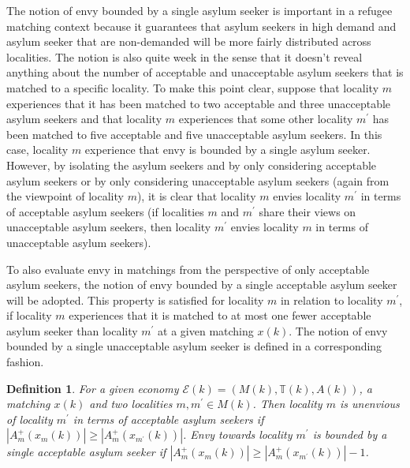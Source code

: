 \documentclass[12pt,fleqn]{article}
\newtheorem{definition}{Definition}
\begin{document}
\noindent The notion of envy bounded by a single asylum seeker is important in a refugee matching context because it guarantees that asylum seekers in high demand and asylum seeker that are non-demanded will be more fairly distributed across localities. The notion is also quite week in the sense that it doesn't reveal anything about the number of acceptable and unacceptable asylum seekers that is matched to a specific locality. To make this point clear, suppose that locality $m$ experiences that it has been matched to two acceptable and three unacceptable asylum seekers and that locality $m$ experiences that some other locality $m^\prime$ has been matched to five acceptable and five unacceptable asylum seekers. In this case, locality $m$ experience that envy is bounded by a single asylum seeker. However, by isolating the asylum seekers and by only considering acceptable asylum seekers or by only considering unacceptable asylum seekers (again from the viewpoint of locality $m$), it is clear that locality $m$ envies locality $m^\prime$ in terms of acceptable asylum seekers (if localities $m$ and $m^\prime$ share their views on unacceptable asylum seekers, then locality $m^\prime$ envies locality $m$ in terms of unacceptable asylum seekers).

To also evaluate envy in matchings from the perspective of only acceptable asylum seekers, the notion of envy bounded by a single acceptable asylum seeker will be adopted. This property is satisfied for locality $m$ in relation to locality $m^\prime$, if locality $m$ experiences that it is matched to at most one fewer acceptable asylum seeker than locality $m^\prime$ at a given matching $x(k)$. The notion of envy bounded by a single unacceptable asylum seeker is defined in a corresponding fashion.

\begin{definition}\rm\label{DEF:1-Envy_ACC}
For a given economy $\mathcal{E}(k)=(M(k),\mathbb{T}(k),A(k))$, a matching $x(k)$ and two localities $m,m^\prime\in M(k)$. Then locality $m$ is unenvious of locality $m^\prime$ in terms of acceptable asylum seekers if $|A_m^+(x_m(k))|\geq |A_m^+(x_{m^\prime}(k))|$. Envy towards locality $m^\prime$ is bounded by a single acceptable asylum seeker if $|A_m^+(x_m(k))|\geq |A_m^+(x_{m^\prime}(k))|-1$.
\end{definition}
\end{document}
